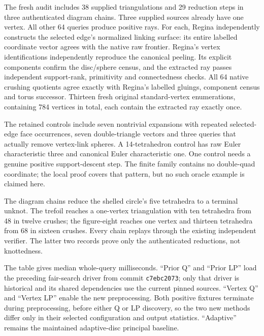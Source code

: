 The fresh audit includes 38 supplied triangulations and 29 reduction steps
in three authenticated diagram chains.  Three supplied sources already
have one vertex.  All other 64 queries produce positive rays.  For each,
Regina independently constructs the selected edge's normalized linking
surface: its entire labelled coordinate vector agrees with the native raw
frontier.  Regina's vertex identifications independently reproduce the
canonical peeling.  Its explicit components confirm the disc/sphere
census, and the extracted ray passes independent support-rank,
primitivity and connectedness checks.  All 64 native crushing quotients
agree exactly with Regina's labelled gluings, component census and torus
successor.  Thirteen fresh original standard-vertex enumerations, containing
784 vertices in total, each contain the extracted ray exactly once.

The retained controls include seven nontrivial expansions with repeated
selected-edge face occurrences, seven double-triangle vectors and three
queries that actually remove vertex-link spheres.  A 14-tetrahedron
control has raw Euler characteristic three and canonical Euler
characteristic one.  One control needs a genuine positive support-descent
step.  The finite family contains no double-quad coordinate; the local
proof covers that pattern, but no such oracle example is claimed here.

The diagram chains reduce the shelled circle's five tetrahedra to a
terminal unknot.  The trefoil reaches a one-vertex triangulation with ten
tetrahedra from 48 in twelve crushes; the figure-eight reaches one vertex
and thirteen tetrahedra from 68 in sixteen crushes.  Every chain replays
through the existing independent verifier.  The latter two records prove
only the authenticated reductions, not knottedness.

\begin{center}

\end{center}

The table gives median whole-query milliseconds.  ``Prior Q'' and
``Prior LP'' load the preceding fair-search driver from commit
\texttt{c7ebc2073}; only that driver is historical and its shared dependencies
use the current pinned sources.  ``Vertex Q'' and ``Vertex LP'' enable the
new preprocessing.  Both positive fixtures terminate during preprocessing,
before either Q or LP discovery, so the two new methods differ only in
their selected configuration and output statistics.  ``Adaptive'' remains
the maintained adaptive-disc principal baseline.

